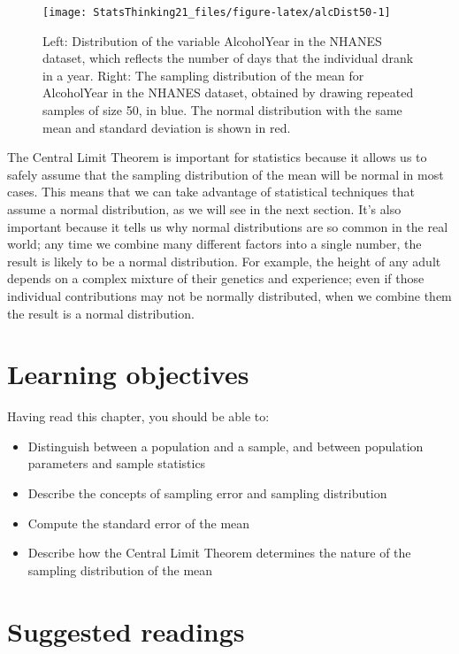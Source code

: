\documentclass[12pt,]{book}
\providecommand{\tightlist}{%
  \setlength{\itemsep}{0pt}\setlength{\parskip}{0pt}}
\theoremstyle{definition}
\theoremstyle{definition}
\theoremstyle{definition}
\theoremstyle{remark}
\begin{document}
\begin{figure}
\texttt{[image: StatsThinking21\_files/figure-latex/alcDist50-1]} \caption{Left: Distribution of the variable AlcoholYear in the NHANES dataset, which reflects the number of days that the individual drank in a year. Right: The sampling distribution of the mean for AlcoholYear in the NHANES dataset, obtained by drawing repeated samples of size 50, in blue.  The normal distribution with the same mean and standard deviation is shown in red.}\label{fig:alcDist50}
\end{figure}

The Central Limit Theorem is important for statistics because it allows us to safely assume that the sampling distribution of the mean will be normal in most cases. This means that we can take advantage of statistical techniques that assume a normal distribution, as we will see in the next section. It's also important because it tells us why normal distributions are so common in the real world; any time we combine many different factors into a single number, the result is likely to be a normal distribution. For example, the height of any adult depends on a complex mixture of their genetics and experience; even if those individual contributions may not be normally distributed, when we combine them the result is a normal distribution.

\hypertarget{learning-objectives-6}{%
\section{Learning objectives}\label{learning-objectives-6}}

Having read this chapter, you should be able to:

\begin{itemize}
\tightlist
\item
  Distinguish between a population and a sample, and between population parameters and sample statistics
\item
  Describe the concepts of sampling error and sampling distribution
\item
  Compute the standard error of the mean
\item
  Describe how the Central Limit Theorem determines the nature of the sampling distribution of the mean
\end{itemize}

\hypertarget{suggested-readings-4}{%
\section{Suggested readings}\label{suggested-readings-4}}
\end{document}
